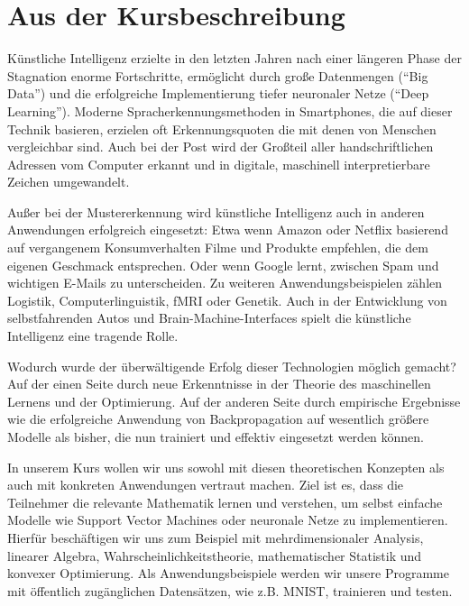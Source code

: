\section{Aus der Kursbeschreibung}
Künstliche Intelligenz erzielte in den letzten Jahren nach einer längeren Phase der Stagnation enorme Fortschritte, ermöglicht durch große Datenmengen (\enquote{Big Data}) und die erfolgreiche Implementierung tiefer neuronaler Netze (\enquote{Deep Learning}). Moderne Spracherkennungsmethoden in Smartphones, die auf dieser Technik basieren, erzielen oft Erkennungsquoten die mit denen von Menschen vergleichbar sind. Auch bei der Post wird der Großteil aller handschriftlichen Adressen vom Computer erkannt und in digitale, maschinell interpretierbare Zeichen umgewandelt.

Außer bei der Mustererkennung wird künstliche Intelligenz auch in anderen Anwendungen erfolgreich eingesetzt: Etwa wenn Amazon oder Netflix basierend auf vergangenem Konsumverhalten Filme und Produkte empfehlen, die dem eigenen Geschmack entsprechen. Oder wenn Google lernt, zwischen Spam und wichtigen E-Mails zu unterscheiden. Zu weiteren Anwendungsbeispielen zählen Logistik, Computerlinguistik, fMRI oder Genetik. 
Auch in der Entwicklung von selbstfahrenden Autos und Brain-Machine-Interfaces spielt die  künstliche Intelligenz eine tragende Rolle.

Wodurch wurde der überwältigende Erfolg dieser Technologien möglich gemacht?
Auf der einen Seite durch neue Erkenntnisse in der Theorie des maschinellen Lernens und der Optimierung. Auf der anderen Seite durch empirische Ergebnisse wie die erfolgreiche Anwendung von Backpropagation auf wesentlich größere Modelle als bisher, die nun trainiert und effektiv eingesetzt werden können.

In unserem Kurs wollen wir uns sowohl mit diesen theoretischen Konzepten als auch mit konkreten Anwendungen vertraut machen. Ziel ist es, dass die Teilnehmer die relevante Mathematik lernen und verstehen, um selbst einfache Modelle wie Support Vector Machines oder neuronale Netze zu implementieren. Hierfür beschäftigen wir uns zum Beispiel mit mehrdimensionaler Analysis, linearer Algebra, Wahrscheinlichkeitstheorie, mathematischer Statistik und konvexer Optimierung. Als Anwendungsbeispiele werden wir unsere Programme mit öffentlich zugänglichen Datensätzen, wie z.B. MNIST, trainieren und testen. 
